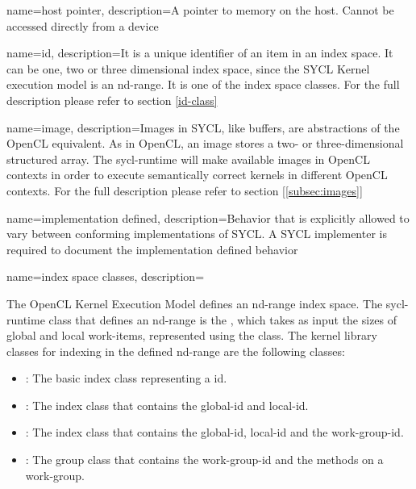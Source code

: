 {
  name={host pointer},
  description={A pointer to memory on the host.
        Cannot be accessed directly from a \gls{device}}
}

{
  name=id,
  description={It is a unique identifier of an item in an index space. It can
               be one, two or three dimensional index space, since the SYCL
               Kernel execution model is an nd-range. It is one of the index
               space classes. For the full description please refer to section
         \ref{id-class}}
}

{
  name=image,
  description={Images in SYCL, like buffers, are abstractions of the OpenCL
               equivalent. As in OpenCL, an image stores a two- or
               three-dimensional structured array. The \gls{sycl-runtime} will make
               available images in OpenCL contexts in order to execute
               semantically correct kernels in different OpenCL contexts.
               For the full description please refer to section [\ref{subsec:images}]}
}

{
  name={implementation defined},
  description={Behavior that is explicitly allowed to vary between
               conforming implementations of SYCL. A SYCL
               implementer is required to document the
               implementation defined behavior}
}

{
  name={index space classes},
  description={The OpenCL Kernel Execution Model defines an nd-range index
              space. The \gls{sycl-runtime} class that defines an nd-range is the 
              , which takes as input the sizes
              of global and local work-items, represented using the 
               class. The kernel library classes
              for indexing in the defined nd-range are the following classes: 
              \begin{itemize}
              \item {} : The basic index class 
                 representing a \gls{id}. 
              \item {} : The index class that contains
                 the \gls{global-id} and \gls{local-id}. 
              \item {} : The index class that
                 contains the \gls{global-id}, \gls{local-id} and the
                 \gls{work-group-id}.
              \item {} : The group class that contains
                 the \gls{work-group-id} and the methods on a work-group.
              \end{itemize}
              \nopostdesc
             }
}

